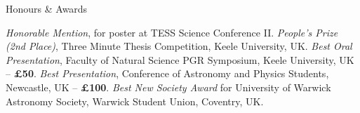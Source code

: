 \begin{rubric}{Honours \& Awards}

\entry*[2021]
    \textit{Honorable Mention}, for poster at TESS Science Conference II.
\entry*[2021]
    \textit{People's Prize (2nd Place)}, Three Minute Thesis Competition, Keele University, UK.
\entry*[2021]
    \textit{Best Oral Presentation}, Faculty of Natural Science PGR Symposium, Keele University, UK -- \textbf{£50}. 
\entry*[2018]
    \textit{Best Presentation}, Conference of Astronomy and Physics Students, Newcastle, UK -- \textbf{£100}. 
\entry*[2017]
    \textit{Best New Society Award} for University of Warwick Astronomy Society, Warwick Student Union, Coventry, UK. 

\end{rubric}